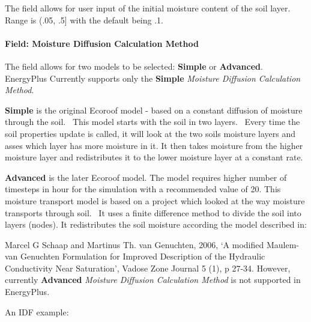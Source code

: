 The field allows for user input of the initial moisture content of the soil layer. Range is (.05, .5{]} with the default being .1.

\paragraph{Field: Moisture Diffusion Calculation Method}\label{field-moisture-diffusion-calculation-method}

The field allows for two models to be selected: \textbf{Simple} or \textbf{Advanced}. EnergyPlus Currently supports only the \textbf{Simple} \textit{Moisture Diffusion Calculation Method}.

\textbf{Simple} is the original Ecoroof model - based on a constant diffusion of moisture through the soil.~ This model starts with the soil in two layers.~ Every time the soil properties update is called, it will look at the two soils moisture layers and asses which layer has more moisture in it. It then takes moisture from the higher moisture layer and redistributes it to the lower moisture layer at a constant rate.

\textbf{Advanced} is the later Ecoroof model. The model requires higher number of timesteps in hour for the simulation with a recommended value of 20. This moisture transport model is based on a project which looked at the way moisture transports through soil.~ It uses a finite difference method to divide the soil into layers (nodes). It redistributes the soil moisture according the model described in:

Marcel G Schaap and Martinus Th. van Genuchten, 2006, `A modified Maulem-van Genuchten Formulation for Improved Description of the Hydraulic Conductivity Near Saturation', Vadose Zone Journal 5 (1), p 27-34. However, currently \textbf{Advanced} \textit{Moisture Diffusion Calculation Method} is not supported in EnergyPlus.

An IDF example:

